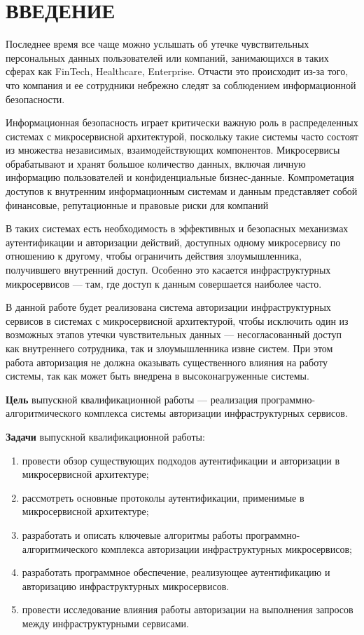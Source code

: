 {\centering \chapter*{ВВЕДЕНИЕ}}

Последнее время все чаще можно услышать об утечке чувствительных персональных данных пользователей или компаний, занимающихся в таких сферах как FinTech, Healthcare, Enterprise. Отчасти это происходит из-за того, что компания и ее сотрудники небрежно следят за соблюдением информационной безопасности.

Информационная безопасность играет критически важную роль в распределенных системах с микросервисной архитектурой, поскольку такие системы часто состоят из множества независимых, взаимодействующих компонентов. Микросервисы обрабатывают и хранят большое количество данных, включая личную информацию пользователей и конфиденциальные бизнес-данные. Компрометация доступов к внутренним информационным системам и данным представляет собой финансовые, репутационные и правовые риски для компаний

В таких системах есть необходимость в эффективных и безопасных механизмах аутентификации и авторизации действий, доступных одному микросервису по отношению к другому, чтобы ограничить действия злоумышленника, получившего внутренний доступ. Особенно это касается инфраструктурных микросервисов --- там, где доступ к данным совершается наиболее часто.

В данной работе будет реализована система авторизации инфраструктурных сервисов в системах с микросервисной архитектурой, чтобы исключить один из возможных этапов утечки чувствительных данных --- несогласованный доступ как внутреннего сотрудника, так и злоумышленника извне систем. При этом работа авторизация не должна оказывать существенного влияния на работу системы, так как может быть внедрена в высоконагруженные системы.

\textbf{Цель} выпускной квалификационной работы --- реализация программно-алгоритмического комплекса системы авторизации инфраструктурных сервисов.

\textbf{Задачи} выпускной квалификационной работы:
\begin{enumerate}
\item провести обзор существующих подходов аутентификации и авторизации в микросервисной архитектуре;
\item рассмотреть основные протоколы аутентификации, применимые в микросервисной архитектуре;
\item разработать и описать ключевые алгоритмы работы программно-алгоритмического комплекса авторизации инфраструктурных микросервисов;
\item разработать программное обеспечение, реализующее аутентификацию и авторизацию инфраструктурных микросервисов.
\item провести исследование влияния работы авторизации на выполнения запросов между инфраструктурными сервисами.

\end{enumerate}


